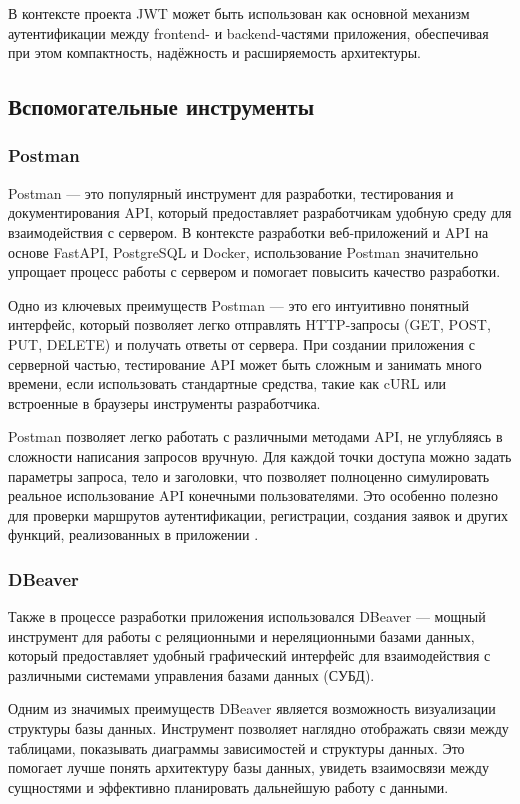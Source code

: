 \documentclass[diploma]{SCWorks}
\begin{document}
В контексте проекта JWT может быть использован как основной 
механизм аутентификации между frontend- и backend-частями приложения, 
обеспечивая при этом компактность, надёжность и расширяемость архитектуры.

\subsection{Вспомогательные инструменты}

\subsubsection{Postman}

Postman — это популярный инструмент для разработки, тестирования и 
документирования API, который предоставляет разработчикам удобную среду для 
взаимодействия с сервером. В контексте разработки веб-приложений и API на 
основе FastAPI, PostgreSQL и Docker, использование Postman значительно упрощает 
процесс работы с сервером и помогает повысить качество разработки.

Одно из ключевых преимуществ Postman — это его интуитивно понятный интерфейс, 
который позволяет легко отправлять HTTP-запросы (GET, POST, PUT, DELETE) и 
получать ответы от сервера. При создании приложения с серверной частью, 
тестирование API может быть сложным и занимать много времени, если 
использовать стандартные средства, такие как cURL или встроенные в браузеры 
инструменты разработчика. 

Postman позволяет легко работать с различными методами API, не углубляясь в 
сложности написания запросов вручную. Для каждой точки доступа можно задать 
параметры запроса, тело и заголовки, что позволяет полноценно симулировать 
реальное использование API конечными пользователями. Это особенно полезно для 
проверки маршрутов аутентификации, регистрации, создания заявок и других 
функций, реализованных в приложении \cite{postman}.

\subsubsection{DBeaver}

Также в процессе разработки приложения использовался DBeaver — мощный 
инструмент для работы с реляционными и нереляционными базами данных, 
который предоставляет удобный графический интерфейс для взаимодействия с 
различными системами управления базами данных (СУБД).

Одним из значимых преимуществ DBeaver является возможность визуализации 
структуры базы данных. Инструмент позволяет наглядно отображать связи между 
таблицами, показывать диаграммы зависимостей и структуры данных. 
Это помогает лучше понять архитектуру базы данных, увидеть взаимосвязи между 
сущностями и эффективно планировать дальнейшую работу с данными.
\end{document}
